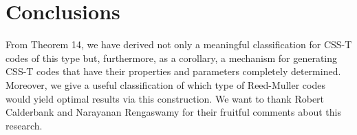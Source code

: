 \documentclass{amsart}
\theoremstyle{definition}
\begin{document}


\section{Conclusions}
From Theorem 14, we have derived not only a meaningful classification for CSS-T codes of this type but, furthermore, as a corollary, a mechanism for generating CSS-T codes that have their properties and parameters completely determined. Moreover, we give a useful classification of which type of Reed-Muller codes would yield optimal results via this construction. We want to thank Robert Calderbank and Narayanan Rengaswamy for their fruitful comments about this research. 



\end{document}
